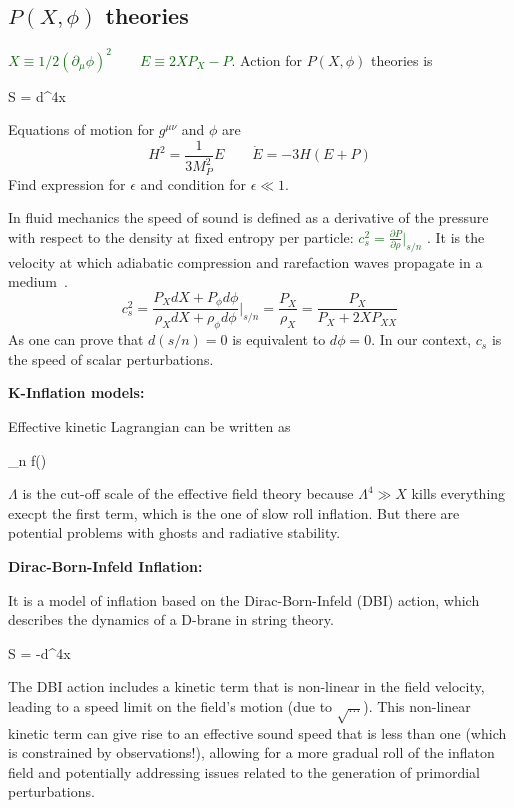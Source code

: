 \subsection{$P(X,\phi)$ theories}\label{sec:Pxphi}
\textcolor{darkgreen}{$X \equiv 1/2(\partial_{\mu} \phi)^2 \qquad E \equiv 2XP_X -P$}. Action for $P(X,\phi)$ theories is 
\begin{eqopt}
    S = \int d^4x 
\end{eqopt}
Equations of motion for $g^{\mu\nu}$ and $\phi$ are
\begin{equation}
    H^2 = \frac{1}{3M_P^2}E \qquad \dot{E} = -3H\left(E+P\right)
\end{equation}
Find expression for $\epsilon$ and condition for $\epsilon \ll 1$.

In fluid mechanics the speed of sound is defined as a derivative of the pressure with
respect to the density at fixed entropy per particle:
\textcolor{darkgreen}{$c_s^2 = \frac{\partial P}{\partial \rho}\big|_{s/n}$} .
It is the velocity at which adiabatic compression and rarefaction waves propagate
in a medium~\cite{piattellaNoteThermodynamicsSpeed2014}.
\begin{equation}
    c_s^2 = \frac{P_X dX + P_\phi d\phi}{\rho_X dX + \rho_\phi d\phi}\Bigg|_{s/n} = \frac{P_X}{\rho_X} = \frac{P_{X}}{P_X + 2XP_{XX}}
\end{equation}
As one can prove that $d(s/n)=0$ is equivalent to $d\phi = 0$. In our context, $c_s$ is the speed of scalar perturbations.

\begin{mycolorbox}
    \textbf{K-Inflation models:}

    Effective kinetic Lagrangian can be written as
    \begin{eqopt}
         \supset  \sum_{n}  f(\phi) 
    \end{eqopt}
$\Lambda$ is the cut-off scale of the effective field theory because $\Lambda^4 \gg X$ kills everything execpt the first term, which is the one of slow roll inflation.
But there are potential problems with ghosts and radiative stability.
\end{mycolorbox}    
\begin{mycolorbox}
    \textbf{Dirac-Born-Infeld Inflation:}

    It is a model of inflation based on the Dirac-Born-Infeld (DBI) action, which describes the dynamics of a D-brane in string theory. 
    \begin{eqopt}
        S = -\int d^4x  
    \end{eqopt}
    The DBI action includes a kinetic term that is non-linear in the field velocity, leading to a speed limit on the field's motion (due to $\sqrt{\dots}$). This non-linear kinetic term can give rise to an effective sound speed that is less than one (which is constrained by observations!), allowing for a more gradual roll of the inflaton field and potentially addressing issues related to the generation of primordial perturbations.
\end{mycolorbox}    